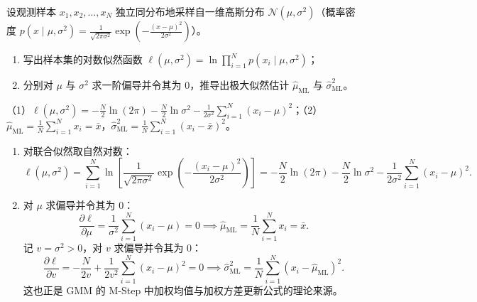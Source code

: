 \begin{exercise}[title={一维高斯分布参数的极大似然估计推导},level=standard,points=15,tags={高斯分布,极大似然估计,MLE}]
设观测样本 $x_1, x_2, \dots, x_N$ 独立同分布地采样自一维高斯分布 $\mathcal{N}(\mu, \sigma^2)$（概率密度 $p(x\mid \mu, \sigma^2) = \frac{1}{\sqrt{2\pi\sigma^2}}\exp\!\left(-\frac{(x-\mu)^2}{2\sigma^2}\right)$）。
\begin{enumerate}
  \item 写出样本集的对数似然函数 $\ell(\mu, \sigma^2) = \ln \prod_{i=1}^{N} p(x_i \mid \mu, \sigma^2)$；
  \item 分别对 $\mu$ 与 $\sigma^2$ 求一阶偏导并令其为 $0$，推导出极大似然估计 $\hat{\mu}_{\mathrm{ML}}$ 与 $\hat{\sigma}^2_{\mathrm{ML}}$。
\end{enumerate}
\begin{answer}
（1）$\ell(\mu, \sigma^2) = -\frac{N}{2}\ln(2\pi) - \frac{N}{2}\ln\sigma^2 - \frac{1}{2\sigma^2}\sum_{i=1}^{N}(x_i-\mu)^2$；（2）$\hat{\mu}_{\mathrm{ML}} = \frac{1}{N}\sum_{i=1}^{N} x_i = \bar{x}$，$\hat{\sigma}^2_{\mathrm{ML}} = \frac{1}{N}\sum_{i=1}^{N}(x_i - \bar{x})^2$。
\end{answer}
\begin{solution}
\begin{enumerate}
  \item 对联合似然取自然对数：
  \[
    \ell(\mu, \sigma^2)
    = \sum_{i=1}^{N}\ln\left[\frac{1}{\sqrt{2\pi\sigma^2}}\exp\!\left(-\frac{(x_i-\mu)^2}{2\sigma^2}\right)\right]
    = -\frac{N}{2}\ln(2\pi) - \frac{N}{2}\ln\sigma^2 - \frac{1}{2\sigma^2}\sum_{i=1}^{N}(x_i - \mu)^2.
  \]
  \item 对 $\mu$ 求偏导并令其为 $0$：
  \[
    \frac{\partial \ell}{\partial \mu} = \frac{1}{\sigma^2}\sum_{i=1}^{N}(x_i - \mu) = 0
    \implies \hat{\mu}_{\mathrm{ML}} = \frac{1}{N}\sum_{i=1}^{N} x_i = \bar{x}.
  \]
  记 $v = \sigma^2 > 0$，对 $v$ 求偏导并令其为 $0$：
  \[
    \frac{\partial \ell}{\partial v} = -\frac{N}{2v} + \frac{1}{2v^2}\sum_{i=1}^{N}(x_i - \mu)^2 = 0
    \implies \hat{\sigma}^2_{\mathrm{ML}} = \frac{1}{N}\sum_{i=1}^{N}(x_i - \hat{\mu}_{\mathrm{ML}})^2.
  \]
  这也正是 GMM 的 M-Step 中加权均值与加权方差更新公式的理论来源。
\end{enumerate}
\end{solution}
\end{exercise}

